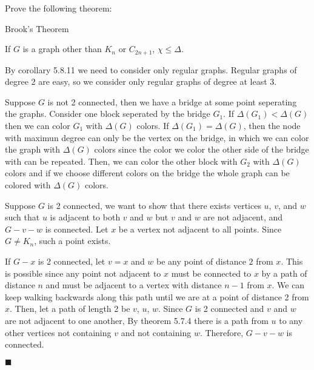 \documentclass[12pt]{article}
\author{Warren Atkison}
\date{\today}
\renewcommand{\qed}{\hfill$\blacksquare$}
\renewenvironment{proof}{\vspace{1em}\begin{addmargin}[2em]{0em}\begin{newproof}}{\end{newproof}\end{addmargin}\qed}
\newenvironment{theorem}[2][Theorem]{\begin{trivlist}
\item[\hskip \labelsep {\bfseries #1} \hskip \labelsep {\bfseries #2.}]}{\end{trivlist}}
\newenvironment{exercise}[2][Exercise]{\begin{trivlist}
\item[\hskip \labelsep {\bfseries #1} \hskip \labelsep {\bfseries #2.}]}{\end{trivlist}}
\begin{document}
\fancyhf{}
\fancyhead[R]{\today}
\fancyfoot[R]{\thepage}

\begin{exercise}{5.8.5 (3pt)}
	Prove the following theorem:
\end{exercise}
\begin{tcolorbox}[colback=blue!10!white,colframe=blue!75!black]
	\begin{theorem}{5.8.12} Brook's Theorem
	\begin{center}
		If $G$ is a graph other than $K_n$ or $C_{2n+1}$, $\chi \le \Delta$.
	\end{center}
	\end{theorem}
\end{tcolorbox}
\begin{proof}
	By corollary 5.8.11 we need to consider only regular graphs. Regular graphs of degree 2 are easy, so we consider only regular graphs of degree at least 3. 

Suppose $G$ is not 2 connected, then we have a bridge at some point seperating the graphs. Consider one block seperated by the bridge $G_1$. If $\Delta(G_1) < \Delta(G)$ then we can color $G_1$ with $\Delta(G)$ colors. If $\Delta(G_1) = \Delta(G)$, then the node with maximun degree can only be the vertex on the bridge, in which we can color the graph with $\Delta(G)$ colors since the color we color the other side of the bridge with can be repeated. Then, we can color the other block with $G_2$ with $\Delta(G)$ colors and if we choose different colors on the bridge the whole graph can be colored with $\Delta(G)$ colors.

Suppose $G$ is 2 connected, we want to show that there exists vertices $u$, $v$, and $w$ such that $u$ is adjacent to both $v$ and $w$ but $v$ and $w$ are not adjacent, and $G - v - w$ is connected. Let $x$ be a vertex not adjacent to all points. Since $G \neq K_n$, such a point exists. 

If $G - x$ is 2 connected, let $v = x$ and $w$ be any point of distance $2$ from $x$. This is possible since any point not adjacent to $x$ must be connected to $x$ by a path of distance $n$ and must be adjacent to a vertex with distance $n - 1$ from $x$. We can keep walking backwards along this path until we are at a point of distance 2 from $x$. Then, let a path of length 2 be $v$, $u$, $w$. Since $G$ is 2 connected and $v$ and $w$ are not adjacent to one another, By theorem 5.7.4 there is a path from $u$ to any other vertices not containing $v$ and not containing $w$. Therefore, $G - v - w$ is connected. 


\end{proof}
\end{document}
